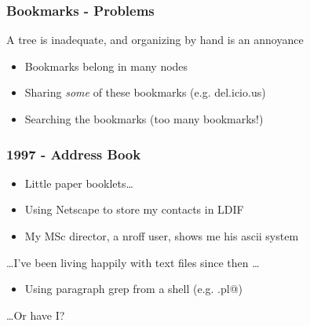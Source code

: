 \documentclass[compress,trans]{beamer}
\begin{document}
\begin{frame}[fragile]
  \frametitle{Bookmarks - Problems}

  A tree is inadequate, and organizing by hand is an annoyance

  \begin{itemize}
    \item Bookmarks belong in many nodes
    \item Sharing \textit{some} of these bookmarks (e.g. del.icio.us)
    \item Searching the bookmarks (too many bookmarks!)
  \end{itemize}


\end{frame}


\begin{frame}[fragile]
  \frametitle{1997 - Address Book}

  \begin{itemize}
    \item Little paper booklets\dots

\vfill\pause

    \item Using Netscape to store my contacts in LDIF

\vfill\pause

    \item My MSc director, a nroff user, shows me his ascii system
  \end{itemize}

\vfill\pause

  \dots I've been living happily with text files since then \dots
  \begin{itemize}
    \item Using paragraph grep from a shell (e.g. \verb@pargrep.pl@)
  \end{itemize}

\vfill\pause

  \hfill \dots Or have I? 

\end{frame}
\end{document}
